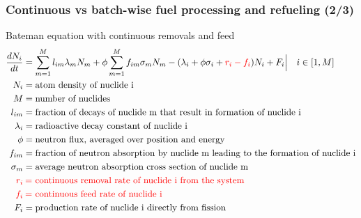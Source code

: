 \begin{frame}
\frametitle{Continuous vs batch-wise fuel processing  and refueling (2/3)}
\begin{block}{Bateman equation with continuous removals and feed}
	\hspace{-0.4in}
	\begin{align}
	\frac{dN_i}{dt} &= \sum_{m=1}^{M}l_{im}\lambda_mN_m + 
	\phi\sum_{m=1}^{M}f_{im}\sigma_mN_m - (\lambda_i + \phi\sigma_i + \textcolor{red}{r_i - 
	f_i})N_i + F_i\Big|\quad{i\in [1,M]} \nonumber \\
	N_i &= \mbox{atom density of nuclide i} \nonumber \\
	M &= \mbox{number of nuclides} \nonumber \\
	l_{im} &= \mbox{fraction of decays of nuclide m that result in formation of 
		nuclide i}\nonumber \\
	\lambda_i &= \mbox{radioactive decay constant of nuclide i} \nonumber \\
	\phi &= \mbox{neutron flux, averaged over position and energy} \nonumber \\
	f_{im} &= \mbox{fraction of neutron absorption by nuclide m leading to the 
		formation of nuclide i} \nonumber \\
	\sigma_m &= \mbox{average neutron absorption cross section of nuclide m} 
	\nonumber \\
	\textcolor{red}{r_i} & \mkern4mu \textcolor{red}{=} \mbox{\space \textcolor{red}{continuous removal rate of nuclide i from the system}} \nonumber \\
	\textcolor{red}{f_i} & \mkern4mu  \textcolor{red}{=} \mbox{\space \textcolor{red}{continuous feed rate of nuclide i}} \nonumber \\
	F_i &= \mbox{production rate of nuclide i directly from fission}\nonumber
	\end{align}
\end{block}

\end{frame}

